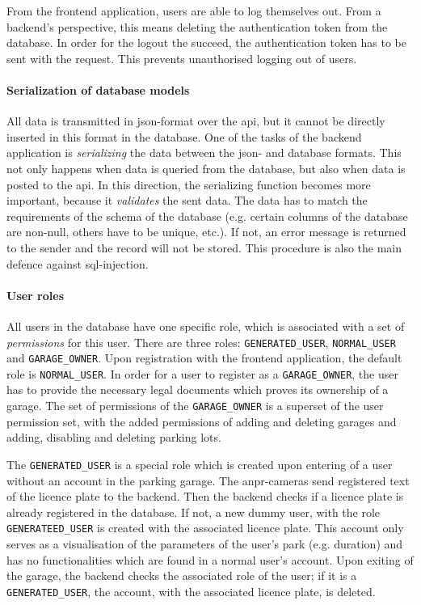 \ind From the frontend application, users are able to log themselves out. From a backend's perspective, this means deleting the authentication token from the database. In order for the logout the succeed, the authentication token has to be sent with the request. This prevents unauthorised logging out of users. 

\paragraph{Serialization of database models}
All data is transmitted in \ac{json}-format over the \ac{api}, but it cannot be directly inserted in this format in the database. One of the tasks of the backend application is \textit{serializing} the data between the \ac{json}- and database formats. This not only happens when data is queried from the database, but also when data is posted to the \ac{api}. In this direction, the serializing function becomes more important, because it \textit{validates} the sent data. The data has to match the requirements of the schema of the database (e.g. certain columns of the database are non-null, others have to be unique, etc.). If not, an error message is returned to the sender and the record will not be stored. This procedure is also the main defence against \ac{sql}-injection.

\paragraph{User roles}
All users in the database have one specific role, which is associated with a set of \textit{permissions} for this user. There are three roles: \verb|GENERATED_USER|, \verb|NORMAL_USER| and \verb|GARAGE_OWNER|. Upon registration with the frontend application, the default role is \verb|NORMAL_USER|. In order for a user to register as a \verb|GARAGE_OWNER|, the user has to provide the necessary legal documents which proves its ownership of a garage. The set of permissions of the \verb|GARAGE_OWNER| is a superset of the user permission set, with the added permissions of adding and deleting garages and adding, disabling and deleting parking lots.

\ind The \verb|GENERATED_USER| is a special role which is created upon entering of a user without an account in the parking garage. The \ac{anpr}-cameras send registered text of the licence plate to the backend. Then the backend checks if a licence plate is already registered in the database. If not, a new dummy user, with the role \verb|GENERATEED_USER| is created with the associated licence plate. This account only serves as a visualisation of the parameters of the user's park (e.g. duration) and has no functionalities which are found in a normal user's account. Upon exiting of the garage, the backend checks the associated role of the user; if it is a \verb|GENERATED_USER|, the account, with the associated licence plate, is deleted.



